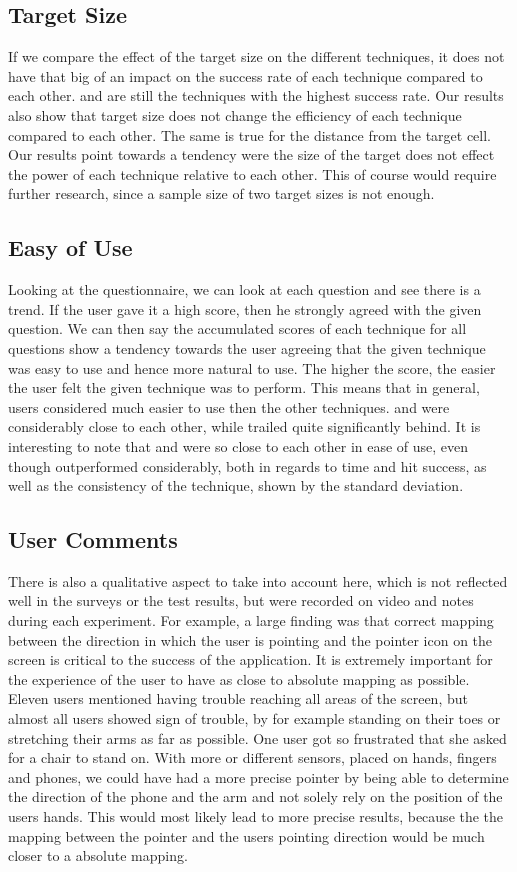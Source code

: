 \subsection{Target Size}
If we compare the effect of the target size on the different techniques, it does not have that big of an impact on the success rate of each technique compared to each other. 
\swipe and \throw are still the techniques with the highest success rate.
Our results also show that target size does not change the efficiency of each technique compared to each other.
The same is true for the distance from the target cell. 
Our results point towards a tendency were the size of the target does not effect the power of each technique relative to each other.
This of course would require further research, since a sample size of two target sizes is not enough. 

\subsection{Easy of Use}
Looking at the questionnaire, we can look at each question and see there is a trend.
If the user gave it a high score, then he strongly agreed with the given question.
We can then say the accumulated scores of each technique for all questions show a tendency towards the user agreeing that the given technique was easy to use and hence more natural to use.
The higher the score, the easier the user felt the given technique was to perform.
This means that in general, users considered \swipe much easier to use then the other techniques. 
\throw and \tilt were considerably close to each other, while \pinch trailed quite significantly behind.
It is interesting to note that \throw and \tilt were so close to each other in ease of use, even though \throw outperformed \tilt considerably, both in regards to time and hit success, as well as the consistency of the technique, shown by the standard deviation. 

\subsection{User Comments}
There is also a qualitative aspect to take into account here, which is not reflected well in the surveys or the test results, but were recorded on video and notes during each experiment.
For example, a large finding was that correct mapping between the direction in which the user is pointing and the pointer icon on the screen is critical to the success of the application.
It is extremely important for the experience of the user to have as close to absolute mapping as possible. 
Eleven users mentioned having trouble reaching all areas of the screen, but almost all users showed sign of trouble, by for example standing on their toes or stretching their arms as far as possible.
One user got so frustrated that she asked for a chair to stand on. 
With more or different sensors, placed on hands, fingers and phones, we could have had a more precise pointer by being able to determine the direction of the phone and the arm and not solely rely on the position of the users hands.
This would most likely lead to more precise results, because the the mapping between the pointer and the users pointing direction would be much closer to a absolute mapping.

